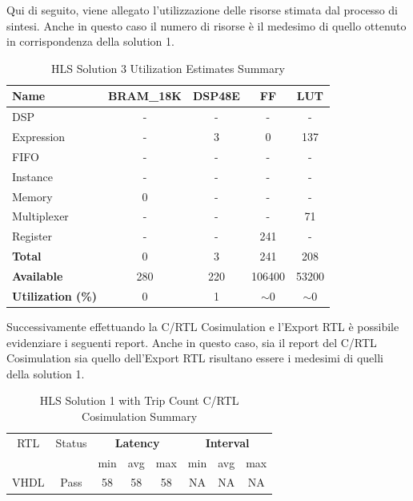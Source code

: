 Qui di seguito, viene allegato l'utilizzazione delle risorse stimata dal processo di sintesi. Anche in questo caso il numero di risorse è il medesimo di quello ottenuto in corrispondenza della solution 1.
\begin{table}[h]
	\centering
	\begin{tabular}{|l|c|c|c|c|}
		\hline
		\textbf{Name}    & \textbf{BRAM\_18K} & \textbf{DSP48E} & \textbf{FF} & \textbf{LUT} \\ \hline
		DSP              & -                   & -               & -           & -            \\ 
		Expression       & -                   & 3               & 0           & 137          \\ 
		FIFO             & -                   & -               & -           & -            \\ 
		Instance         & -                   & -               & -           & -            \\ 
		Memory           & 0                   & -               & -          & -            \\ 
		Multiplexer      & -                   & -               & -           & 71          \\ 
		Register         & -                   & -               & 241         & -            \\ \hline
		\textbf{Total}   & 0                   & 3               & 241         & 208          \\ \hline
		\textbf{Available} & 280               & 220             & 106400      & 53200        \\ \hline
		\textbf{Utilization (\%)} & 0            & 1               & $\sim$0     & $\sim$0      \\ \hline
	\end{tabular}
	\caption{HLS Solution 3 Utilization Estimates Summary}
	\label{tab:hls-solution-3-utilization-estimates-summary}
\end{table}

Successivamente effettuando la C/RTL Cosimulation e l'Export RTL è possibile evidenziare i seguenti report. Anche in questo caso, sia il report del C/RTL Cosimulation sia quello dell'Export RTL risultano essere i medesimi di quelli della solution 1.
\begin{table}[H]
	\centering
	\begin{tabular}{|c|c|c|c|c|c|c|c|}
		\hline
		\multicolumn{1}{|c|}{RTL} & \multicolumn{1}{|c|}{Status} & \multicolumn{3}{c|}{\textbf{Latency}} & \multicolumn{3}{c|}{\textbf{Interval}} \\
		&  & min & avg & max & min & avg & max \\
		\hline
		VHDL & Pass & 58 & 58 & 58 & NA & NA & NA \\
		\hline
	\end{tabular}
	\caption{HLS Solution 1 with Trip Count C/RTL Cosimulation Summary }
	\label{tab:hls-solution-1-cosimulation-summary}
\end{table}

